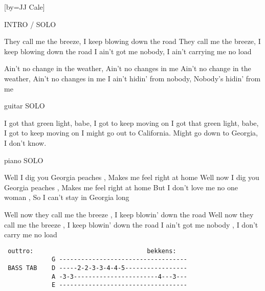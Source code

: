

[by=JJ Cale]


\beginchorus
INTRO / SOLO
\endchorus

\beginverse
They call me the breeze, \brk  I keep blowing down the road
They call me the breeze, \brk  I keep blowing down the road
I ain't got me nobody, \brk  I ain't carrying me no load
\endverse

\beginverse
Ain't no change in the weather, \brk  Ain't no changes in me
Ain't no change in the weather, \brk  Ain't no changes in me
I ain't hidin' from nobody, \brk  Nobody's hidin' from me
\endverse

\beginchorus
guitar SOLO
\endchorus

\beginverse
I got that green light, babe, \brk  I got to keep moving on
I got that green light, babe, \brk  I got to keep moving on
I might go out to California.
Might go down to Georgia, I don't know.
\endverse

\beginchorus
piano SOLO
\endchorus


\beginverse
Well I dig you Georgia peaches , \brk  Makes me feel right at home
Well now I dig you Georgia peaches , \brk  Makes me feel right at home
But I don't love me no one woman , \brk  So I can't stay in Georgia long
\endverse

\beginverse
Well now they call me the breeze , \brk  I keep blowin' down the road
Well now they call me the breeze , \brk  I keep blowin' down the road
I ain't got me nobody , \brk  I don't carry me no load
\endverse

\beginchorus
\chordsoff
\begin{verbatim}
 outtro:                               bekkens:
             G -----------------------------------
 BASS TAB    D -----2-2-3-3-4-4-5-----------------
             A -3-3-----------------------4---3---
             E -----------------------------------
\end{verbatim}
\endchorus

\endsong
